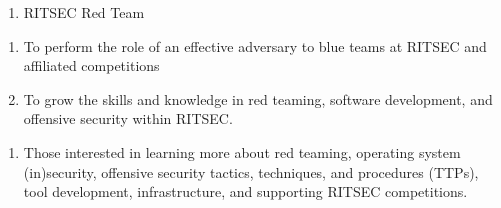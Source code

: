 

\begin{enumerate}
	\item RITSEC Red Team
\end{enumerate}


\begin{enumerate}
	\item To perform the role of an effective adversary to blue teams at RITSEC and
	      affiliated competitions
	\item To grow the skills and knowledge in red teaming, software development, and
	      offensive security within RITSEC.\@
\end{enumerate}


\begin{enumerate}
	\item Those interested in learning more about red teaming, operating system
	      (in)security, offensive security tactics, techniques, and procedures (TTPs),
	      tool development, infrastructure, and supporting RITSEC competitions.
\end{enumerate}


